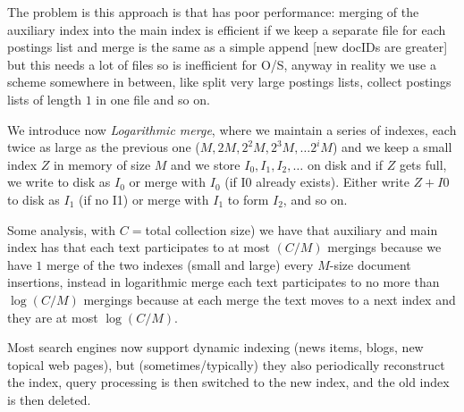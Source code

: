 The problem is this approach is that has poor performance: merging of the auxiliary index into the main index
is efficient if we keep a separate file for each postings list and merge is the same as a simple append
[new docIDs are greater] but this needs a lot of files so is inefficient for O/S, anyway
in reality we use a scheme somewhere in between, like split very large postings lists, 
collect postings lists of length $1$ in one file and so on.

We introduce now \emph{Logarithmic merge}, where we maintain a series of indexes, 
each twice as large as the previous one ($M, 2M , 2^2 M, 2^3 M, \dots 2^iM$) and we keep a small index
$Z$ in memory of size $M$ and we store $I_0, I_1, I_2, \dots$ on disk and if $Z$ gets full, 
we write to disk as $I_0$ or merge with $I_0$ (if I0 already exists).\newline
Either write $Z + I0$ to disk as $I_1$ (if no I1) or merge with $I_1$ to form $I_2$, and so on.

Some analysis, with $C = $total collection size) we have that auxiliary and main index has that 
each text participates to at most $(C/M)$ mergings because we have $1$ merge of the two indexes (small and large)
every $M$-size document insertions, instead in logarithmic merge each text participates to no more than
$\log (C/M)$ mergings because at each merge the text moves to a next index and they are at most $\log (C/M)$.

Most search engines now support dynamic indexing (news items, blogs, new topical web pages), 
but (sometimes/typically) they also periodically reconstruct the index, query processing is then
switched to the new index, and the old index is then deleted.

